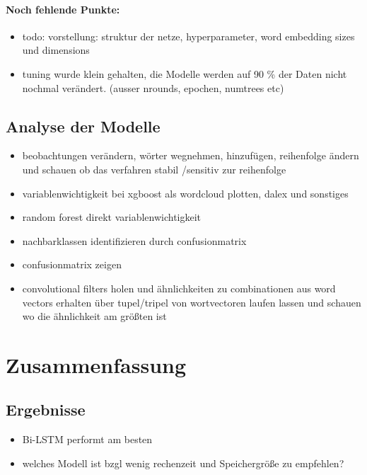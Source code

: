 \documentclass[a4paper,11pt]{article}
\begin{document}
\paragraph{Noch fehlende Punkte:}

\begin{itemize}
    \item todo: vorstellung: struktur der netze, hyperparameter, word embedding sizes und dimensions
    \item tuning wurde klein gehalten, die Modelle werden auf 90 \% der Daten nicht nochmal verändert. (ausser nrounds, epochen, numtrees etc)
\end{itemize}{}

\subsection{Analyse der Modelle}

\begin{itemize}

    \item beobachtungen verändern, wörter wegnehmen, hinzufügen, reihenfolge ändern und schauen ob das verfahren stabil /sensitiv zur reihenfolge
    \item variablenwichtigkeit bei xgboost als wordcloud plotten, dalex und sonstiges
    \item random forest direkt variablenwichtigkeit
    \item nachbarklassen identifizieren durch confusionmatrix
    \item confusionmatrix zeigen
    \item convolutional filters holen und ähnlichkeiten zu combinationen aus word vectors erhalten über tupel/tripel von wortvectoren laufen lassen und schauen wo die ähnlichkeit am größten ist
\end{itemize}{}


\section{Zusammenfassung}

\subsection{Ergebnisse}

\begin{itemize}
    \item Bi-LSTM performt am besten
    \item welches Modell ist bzgl wenig rechenzeit und Speichergröße zu empfehlen?
\end{itemize}{}
\end{document}
